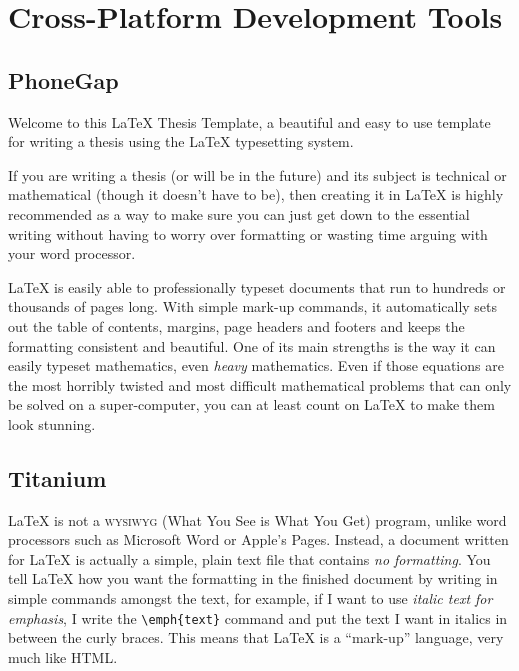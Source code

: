 \section{Cross-Platform Development Tools}


\subsection{PhoneGap}
Welcome to this \LaTeX{} Thesis Template, a beautiful and easy to use template for writing a thesis using the \LaTeX{} typesetting system.

If you are writing a thesis (or will be in the future) and its subject is technical or mathematical (though it doesn't have to be), then creating it in \LaTeX{} is highly recommended as a way to make sure you can just get down to the essential writing without having to worry over formatting or wasting time arguing with your word processor.

\LaTeX{} is easily able to professionally typeset documents that run to hundreds or thousands of pages long. With simple mark-up commands, it automatically sets out the table of contents, margins, page headers and footers and keeps the formatting consistent and beautiful. One of its main strengths is the way it can easily typeset mathematics, even \emph{heavy} mathematics. Even if those equations are the most horribly twisted and most difficult mathematical problems that can only be solved on a super-computer, you can at least count on \LaTeX{} to make them look stunning.


\subsection{Titanium}

\LaTeX{} is not a \textsc{wysiwyg} (What You See is What You Get) program, unlike word processors such as Microsoft Word or Apple's Pages. Instead, a document written for \LaTeX{} is actually a simple, plain text file that contains \emph{no formatting}. You tell \LaTeX{} how you want the formatting in the finished document by writing in simple commands amongst the text, for example, if I want to use \emph{italic text for emphasis}, I write the \verb|\emph{text}| command and put the text I want in italics in between the curly braces. This means that \LaTeX{} is a \enquote{mark-up} language, very much like HTML.
